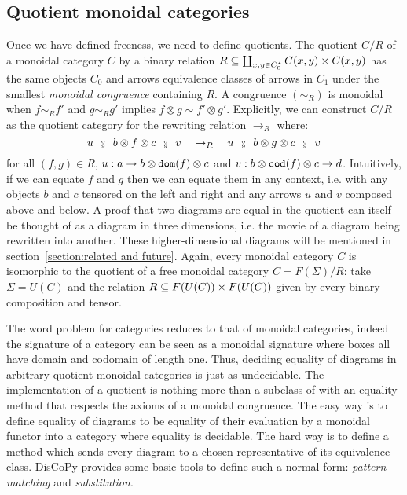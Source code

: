 \subsection{Quotient monoidal categories}

Once we have defined freeness, we need to define quotients.
The quotient $C / R$ of a monoidal category $C$ by a binary relation $R \subseteq \coprod_{x, y \in C_0^\star} C(x, y) \times C(x, y)$ has the same objects $C_0$ and arrows equivalence classes of arrows in $C_1$ under the smallest \emph{monoidal congruence} containing $R$.
A congruence $(\sim_R)$ is monoidal when $f \sim_R f'$ and $g \sim_R g'$ implies $f \otimes g \sim f' \otimes g'$.
Explicitly, we can construct $C / R$ as the quotient category for the rewriting relation $\to_R$ where:
$$u \s \fcmp \s b \otimes f \otimes c \s \fcmp \s v \quad
\to_R \quad u \s \fcmp \s b \otimes g \otimes c \s \fcmp \s v$$
for all $(f, g) \in R$, $u : a \to b \otimes \mathtt{dom}(f) \otimes c$ and $v : b \otimes \mathtt{cod}(f) \otimes c \to d$.
Intuitively, if we can equate $f$ and $g$ then we can equate them in any context, i.e. with any objects $b$ and $c$ tensored on the left and right and any arrows $u$ and $v$ composed above and below.
A proof that two diagrams are equal in the quotient can itself be thought of as a diagram in three dimensions, i.e. the movie of a diagram being rewritten into another.
These higher-dimensional diagrams will be mentioned in section~\ref{section:related and future}.
Again, every monoidal category $C$ is isomorphic to the quotient of a free monoidal category $C = F(\Sigma) / R$: take $\Sigma = U(C)$ and the relation $R \subseteq F(U(C)) \times F(U(C))$ given by every binary composition and tensor.

The word problem for categories reduces to that of monoidal categories, indeed the signature of a category can be seen as a monoidal signature where boxes all have domain and codomain of length one.
Thus, deciding equality of diagrams in arbitrary quotient monoidal categories is just as undecidable.
The implementation of a quotient is nothing more than a subclass of  with an equality method that respects the axioms of a monoidal congruence.
The easy way is to define equality of diagrams to be equality of their evaluation by a monoidal functor into a category where equality is decidable.
The hard way is to define a  method which sends every diagram to a chosen representative of its equivalence class.
DisCoPy provides some basic tools to define such a normal form: \emph{pattern matching} and \emph{substitution}.

